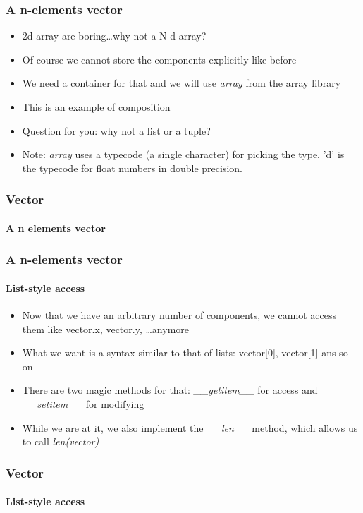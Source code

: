 \documentclass[9pt]{beamer}
\begin{document}
\begin{frame}
  \frametitle{A n-elements vector}
  
  \begin{itemize}
    \item 2d array are boring\dots why not a N-d array?
    \medskip
    \item Of course we cannot store the components explicitly like before
    \medskip
    \item We need a container for that and we will use \emph{array} from the 
          array library
    \medskip
    \item This is an example of \alert{composition}
    \medskip
    \item Question for you: why not a list or a tuple?
    \medskip
    \item Note: \emph{array} uses a typecode (a single character) for picking the
          type. 'd' is the typecode for float numbers in double precision. 
  \end{itemize}
  
\end{frame}


\begin{frame}
  \frametitle{Vector}
  \framesubtitle{A n elements vector}
  
\end{frame}


\begin{frame}
  \frametitle{A n-elements vector}
  \framesubtitle{List-style access}
  
  \begin{itemize}
    \item Now that we have an arbitrary number of components, we cannot access them like 
          vector.x, vector.y, \dots anymore
    \medskip
    \item What we want is a syntax similar to that of lists: vector[0], vector[1]
          ans so on
    \medskip
    \item There are two magic methods for that: \emph{\_\_getitem\_\_} for access 
          and \emph{\_\_setitem\_\_} for modifying
    \medskip
    \item While we are at it, we also implement the \emph{\_\_len\_\_} method,
          which allows us to call \emph{len(vector)}
  \end{itemize}
  
\end{frame}


\begin{frame}
  \frametitle{Vector}
  \framesubtitle{List-style access}
  
\end{frame}
\end{document}
